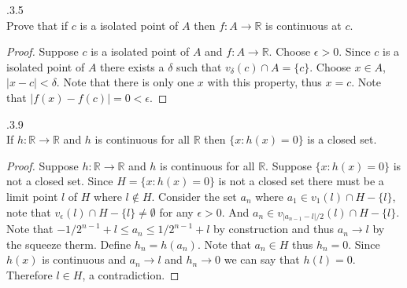 \documentclass[12pt]{article}
\makeatletter
\theoremstyle{homework}
\newenvironment{exercise}[1]
{\def\@currentlabel{#1}\exercisecore}
{\endexercisecore}
\makeatother
\begin{document}
\begin{exercise}

4.3.5 \\
Prove that if $c$ is a isolated point of $A$ then $f:A\rightarrow \mathbb{R}$ is continuous at $c$.
\end{exercise}
\begin{proof}
Suppose $c$ is a isolated point of $A$ and $f:A\rightarrow \mathbb{R}$.  Choose $\epsilon>0$.  Since $c$ is a isolated point of $A$ there exists a $\delta$ such that $v_\delta(c) \cap A =\{c\}$.  Choose $x\in A$, $|x-c|<\delta$.  Note that there is only one $x$ with this property, thus $x=c$.  Note that $|f(x)-f(c)|=0<\epsilon$.
\end{proof}
\begin{exercise}

4.3.9 \\
If $h:\mathbb{R}\rightarrow\mathbb{R}$ and $h$ is continuous for all $\mathbb{R}$ then $\{x:h(x)=0\}$ is a closed set.
\end{exercise}
\begin{proof}
Suppose $h:\mathbb{R}\rightarrow\mathbb{R}$ and $h$ is continuous for all $\mathbb{R}$.  Suppose $\{x:h(x)=0\}$ is not a closed set.  Since $H=\{x:h(x)=0\}$ is not a closed set there must be a limit point $l$ of $H$ where $l\not\in H$.  Consider the set $a_n$ where $a_1\in v_1(l)\cap H-\{l\}$, note that $v_\epsilon(l)\cap H-\{l\}\neq \emptyset$ for any $\epsilon>0$.  And $a_n\in v_{|a_{n-1}-l|/2}(l)\cap H-\{l\}$.  Note that $-1/2^{n-1}+l\leq a_n\leq 1/2^{n-1}+l$ by construction and thus $a_n\rightarrow l$ by the squeeze therm.  Define $h_n=h(a_n)$.  Note that $a_n\in H$  thus $h_n=0$.  Since $h(x)$ is continuous and $a_n\rightarrow l$ and $h_n\rightarrow 0$ we can say that $h(l)=0$.  Therefore $l\in H$, a contradiction.
\end{proof}
\begin{exercise}

10
\end{exercise}
\end{document}
